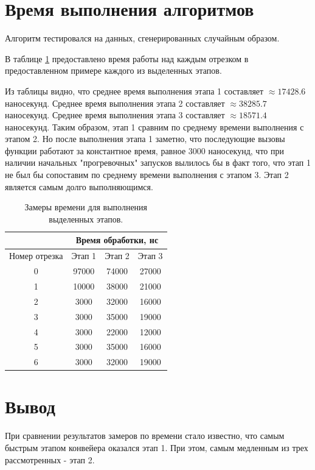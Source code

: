 \documentclass[12pt]{report}
\begin{document}
\newpage
\section{Время выполнения алгоритмов}
Алгоритм тестировался на данных, сгенерированных случайным образом.

В таблице \ref{time1} предоставлено время работы над каждым отрезком в предоставленном примере каждого из выделенных этапов.

Из таблицы видно, что среднее время выполнения этапа 1 составляет $\approx 17428.6$ наносекунд. Среднее время выполнения этапа 2 составляет $\approx 38285.7$ наносекунд. Среднее время выполнения этапа 3 составляет $\approx 18571.4$ наносекунд. Таким образом, этап 1 сравним по среднему времени выполнения с этапом 2. Но после выполнения этапа 1 заметно, что последующие вызовы функции работают за константное время, равное 3000 наносекунд, что при наличии начальных "прогревочных" запусков вылилось бы в факт того, что этап 1 не был бы сопоставим по среднему времени выполнения с этапом 3. Этап 2 является самым долго выполняющимся.

\begin{table}[h]
	\begin{center}
		\caption{\label{time1} Замеры времени для выполнения выделенных этапов.}
		\begin{tabular}{|c |c |c |c|} 
 			\hline
 			&\multicolumn{3}{|c|}{Время обработки, нс}\\
 			\hline
			Номер отрезка & Этап 1 & Этап 2 & Этап 3\\ [0.5ex] 
 			\hline\hline
 			0 & 97000 & 74000 & 27000 \\
 			\hline
 			1 & 10000 & 38000 & 21000 \\
 			\hline
			2 & 3000 & 32000 & 16000 \\
			\hline
			3 & 3000 & 35000 & 19000 \\
			\hline
			4 & 3000 & 22000 & 12000 \\
			\hline
			5 & 3000 & 35000 & 16000 \\
			\hline
			6 & 3000 & 32000 & 19000 \\
			\hline
			\end{tabular}
	\end{center}
\end{table}

\newpage

\section*{Вывод}
При сравнении результатов замеров по времени стало известно, что самым быстрым этапом конвейера оказался этап 1. При этом, самым медленным из трех рассмотренных - этап 2.
\end{document}
